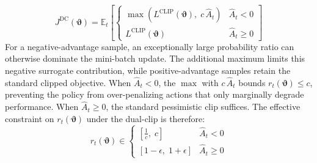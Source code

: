 \documentclass[lettersize,journal]{IEEEtran}
\begin{document}
\begin{equation}
\label{eq:dual_clip_final}
J^{\mathrm{DC}}(\boldsymbol{\vartheta}) = \mathbb{E}_{t} \left[
\begin{cases}
\max\!\left( L^{\mathrm{CLIP}}(\boldsymbol{\vartheta}),\; c\,\hat{A}_t \right) & \hat{A}_t < 0 \\[4pt]
L^{\mathrm{CLIP}}(\boldsymbol{\vartheta}) & \hat{A}_t \geq 0
\end{cases}
\right]
\end{equation}
For a negative-advantage sample, an exceptionally large
probability ratio can otherwise dominate the mini-batch update. The
additional maximum limits this negative surrogate contribution, while
positive-advantage samples retain the standard clipped objective.
When $\hat{A}_t < 0$, the $\max$ with $c\,\hat{A}_t$ bounds $r_t(\boldsymbol{\vartheta}) \leq c$, preventing the policy from over-penalizing actions that only marginally degrade performance. When $\hat{A}_t \geq 0$, the standard pessimistic clip suffices. The effective constraint on $r_t(\boldsymbol{\vartheta})$ under the dual-clip is therefore:
\begin{equation}
\label{eq:rt_bound}
r_t(\boldsymbol{\vartheta}) \in \begin{cases} \left[\frac{1}{c},\; c\right] & \hat{A}_t < 0 \\[4pt] \left[1-\epsilon,\; 1+\epsilon\right] & \hat{A}_t \geq 0 \end{cases}
\end{equation}
\end{document}
